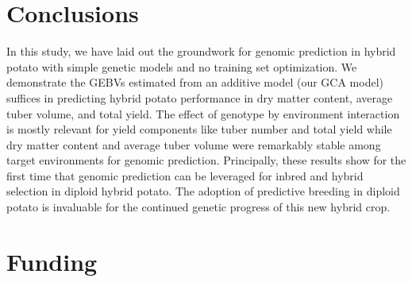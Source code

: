 \begin{refsection}
\section{Conclusions} %

In this study, we have laid out the groundwork for genomic prediction in hybrid potato with simple genetic models and no training set optimization. We demonstrate the GEBVs estimated from an additive model (our GCA model) suffices in predicting hybrid potato performance in dry matter content, average tuber volume, and total yield. The effect of genotype by environment interaction is mostly relevant for yield components like tuber number and total yield while dry matter content and average tuber volume were remarkably stable among target environments for genomic prediction. Principally, these results show for the first time that genomic prediction can be leveraged for inbred and hybrid selection in diploid hybrid potato. The adoption of predictive breeding in diploid potato is invaluable for the continued genetic progress of this new hybrid crop.

\section*{Funding}



\printbibliography[heading=chapterbib, resetnumbers=true]

\end{refsection}


